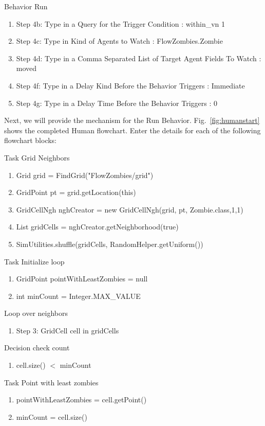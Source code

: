 \documentclass[11pt]{amsart}
\begin{document}
Behavior Run
\begin{enumerate}
 \item Step 4b: Type in a Query for the Trigger Condition : within\_vn 1
 \item Step 4c: Type in Kind of Agents to Watch : FlowZombies.Zombie
 \item Step 4d: Type in a Comma Separated List of Target Agent Fields To Watch : moved
 \item Step 4f: Type in a Delay Kind Before the Behavior Triggers : Immediate
 \item Step 4g: Type in a Delay Time Before the Behavior Triggers : 0   
\end{enumerate}

Next, we will provide the mechanism for the Run Behavior.  Fig.~\ref{fig:humanstart} shows the completed Human flowchart.  Enter the details for each of the following flowchart blocks:

Task Grid Neighbors
\begin{enumerate}
 \item Grid grid = FindGrid("FlowZombies/grid")
 \item GridPoint pt = grid.getLocation(this)
 \item GridCellNgh nghCreator = new GridCellNgh(grid, pt, Zombie.class,1,1)
 \item List gridCells = nghCreator.getNeighborhood(true)
 \item SimUtilities.shuffle(gridCells, RandomHelper.getUniform())
\end{enumerate}

Task Initialize loop
\begin{enumerate}
 \item GridPoint pointWithLeastZombies = null
 \item int minCount = Integer.MAX\_VALUE
\end{enumerate}

Loop over neighbors
\begin{enumerate}
 \item Step 3: GridCell cell in gridCells
\end{enumerate}

Decision check count
\begin{enumerate}
 \item cell.size() $<$ minCount
\end{enumerate}

Task Point with least zombies
\begin{enumerate}
 \item pointWithLeastZombies = cell.getPoint()
 \item minCount = cell.size()
\end{enumerate}
\end{document}
